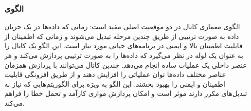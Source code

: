 \subsubsection{الگوی }
\label{archChannelSec}
\begin{RTL}
الگوی معماری کانال در دو موقعیت اصلی مفید است:
زمانی که داده‌ها در یک جریان داده به صورت ترتیبی از طریق
چندین مرحله تبدیل می‌شوند و زمانی که اطمینان از قابلیت اطمینان
بالا و ایمنی در برنامه‌های حیاتی مورد نیاز است.
این الگو یک کانال را به عنوان یک لوله در نظر می‌گیرد که
داده‌ها را به صورت ترتیبی پردازش می‌کند و هر عنصر داخلی
یک عملیات ساده انجام می‌دهد. چندین کانال می‌توانند با پردازش همزمان
عناصر مختلف داده‌ها توان عملیاتی را افزایش دهند و از طریق افزونگی
قابلیت اطمینان و ایمنی را بهبود بخشند. این الگو به ویژه برای الگوریتم‌هایی
که نیاز به تبدیل‌های مکرر دارند موثر است و امکان پردازش
موازی کارآمد و تحمل خطا را فراهم می‌کند.
\end{RTL}